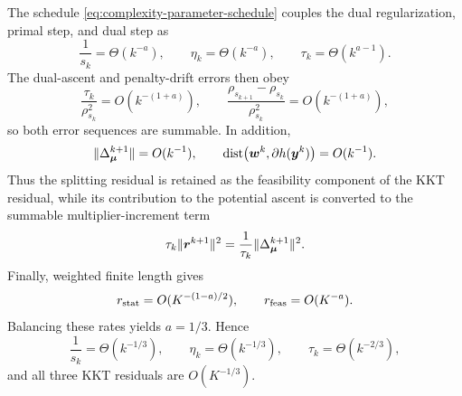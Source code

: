 \begin{remark}
\label{rmk:first-order-eps-minus-three}
The schedule \eqref{eq:complexity-parameter-schedule} couples the dual
regularization, primal step, and dual step as
\[
    \frac{1}{s_k}=\Theta(k^{-a}),
    \qquad
    \eta_k=\Theta(k^{-a}),
    \qquad
    \tau_k=\Theta(k^{a-1}).
\]
The dual-ascent and penalty-drift errors then obey
\[
    \frac{\tau_k}{\rho_{s_k}^2}
    =O(k^{-(1+a)}),
    \qquad
    \frac{\rho_{s_{k+1}}-\rho_{s_k}}{\rho_{s_k}^2}
    =O(k^{-(1+a)}),
\]
so both error sequences are summable.  In addition,
\[
    \|\Delta_{\bm{\mu}}^{k+1}\|=O(k^{-1}),
    \qquad
    \operatorname{dist}\bigl(\bm{w}^k,\partial h(\bm{y}^k)\bigr)=O(k^{-1}).
\]
Thus the splitting residual is retained as the feasibility component of the
KKT residual, while its contribution to the potential ascent is converted to
the summable multiplier-increment term
\[
    \tau_k\|\bm{r}^{k+1}\|^2
    =
    \frac{1}{\tau_k}\|\Delta_{\bm{\mu}}^{k+1}\|^2.
\]
Finally, weighted finite length gives
\[
    r_{\rm stat}=O(K^{-(1-a)/2}),
    \qquad
    r_{\rm feas}=O(K^{-a}).
\]
Balancing these rates yields $a=1/3$.  Hence
\[
    \frac{1}{s_k}=\Theta(k^{-1/3}),
    \qquad
    \eta_k=\Theta(k^{-1/3}),
    \qquad
    \tau_k=\Theta(k^{-2/3}),
\]
and all three KKT residuals are $O(K^{-1/3})$.
\end{remark}



